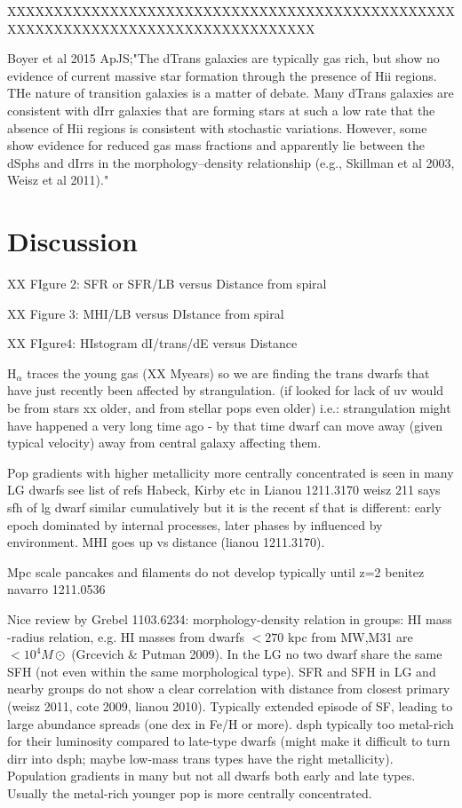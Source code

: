 \documentclass[12pt,preprint]{emulateapj}
\begin{document}
XXXXXXXXXXXXXXXXXXXXXXXXXXXXXXXXXXXXXXXXXXXXXXXXXXXXXXXXXXXXXXXXXXXXXXXXXXXXXXXXX

Boyer et al 2015 ApJS;"The dTrans galaxies are typically gas rich, but show no evidence of current massive star formation through the presence of 
Hii regions. THe nature of transition galaxies is a matter of debate. Many dTrans galaxies are consistent with dIrr 
galaxies that are forming stars at such a low rate that the absence of Hii regions is consistent 
with stochastic variations. However, some show evidence for reduced gas mass fractions and apparently lie between the dSphs 
and dIrrs in the morphology–density relationship (e.g., Skillman et al 2003, Weisz et al 2011)."


\section{Discussion} 


XX FIgure 2: SFR or SFR/LB versus Distance from spiral

XX Figure 3: MHI/LB versus DIstance from spiral

XX FIgure4: HIstogram dI/trans/dE versus Distance

H$_\alpha$ traces the young gas (XX Myears) so we are finding the trans dwarfs that have just recently been affected by strangulation. (if looked for lack 
of uv would be from stars xx older, and from stellar pops even older) i.e.: strangulation might have happened a very long time ago - by that time dwarf can 
move away (given typical velocity) away from central galaxy affecting them.

Pop gradients with higher metallicity more centrally concentrated is seen in many LG dwarfs see list of refs Habeck, Kirby etc in Lianou 1211.3170
weisz 211 says sfh of lg dwarf similar cumulatively but it is the recent sf that is different: early epoch dominated by internal processes, later phases by 
influenced by environment. MHI goes up vs distance (lianou 1211.3170).

Mpc scale pancakes and filaments do not develop typically until z=2 benitez navarro 1211.0536

Nice review by Grebel 1103.6234: morphology-density relation in groups: HI mass -radius relation, e.g. HI masses from dwarfs $<270$ kpc from MW,M31 are
 $<10^4 M\odot$ (Grcevich \& Putman 2009). In the LG no two dwarf share the same SFH (not even within the same morphological type). SFR and SFH in 
 LG and nearby groups do not show a clear correlation with distance from closest primary (weisz 2011, cote 2009, lianou 2010). Typically extended episode 
of SF, leading to large abundance spreads (one dex in Fe/H or more). dsph typically too metal-rich for their luminosity compared to late-type dwarfs (might 
make it difficult to turn dirr into dsph; maybe low-mass trans types have the right metallicity). Population gradients in many but not all dwarfs both early and 
late types. Usually the metal-rich younger pop is more centrally concentrated.
\end{document}
